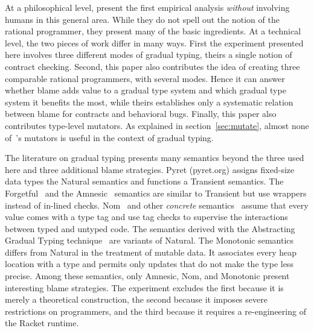 
At a philosophical level, \citet{lksfd-popl-2020} present the first empirical
analysis {\em without\/} involving humans in this general area.  While they do
not spell out the notion of the rational programmer, they present many of the
basic ingredients. At a technical level, the two pieces of work differ in many
ways.  First the experiment presented here involves three different modes of
gradual typing, theirs a single notion of contract checking.  Second, this paper
also contributes the idea of creating three comparable rational programmers,
with several modes. Hence it can answer whether blame adds value to a gradual
type system and which gradual type system it benefits the most, while theirs
establishes only a systematic relation between blame for contracts and
behavioral bugs. Finally, this paper also contributes type-level mutators. As
explained in section~\ref{sec:mutate}, almost none of~\citet{lksfd-popl-2020}'s
mutators is useful in the context of gradual typing.

The literature on gradual typing presents many semantics beyond the three used
here and three additional blame strategies.  Pyret (pyret.org) assigns fixed-size
data types the Natural semantics and functions a Transient semantics. The
Forgetful~\citep{cl-icfp-2017} and the Amnesic~\citep{gfd-oopsla-2019} semantics
are similar to Transient but use wrappers instead of in-lined checks.
Nom~\citep{mt-oopsla-2017} and other \emph{concrete\/}
semantics~\citep{wnlov-popl-2010, rsfbv-popl-2015, rzv-ecoop-2015,
rat-oopsla-2017} assume that every value comes with a type tag and use tag
checks to supervise the interactions between typed and untyped code.  The semantics derived with the Abstracting
Gradual Typing technique~\citep{gct-popl-2016} are variants of Natural.
The Monotonic semantics~\citep{svctg-esop-2015, rsfbv-popl-2015, sfrbcsb-popl-2014, kas-pldi-2019} 
differs from Natural in the treatment of mutable data. It 
associates every heap location with a type and permits only updates that 
do not make the type less precise.  
Among these semantics, only Amnesic, Nom, and Monotonic present interesting blame
strategies.  The experiment excludes the first because it is 
merely a theoretical construction, the second because it imposes severe restrictions on
programmers, and the third because it requires a re-engineering of the Racket runtime. 
